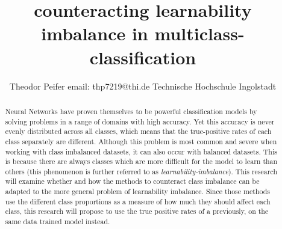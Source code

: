 \documentclass[journal]{IEEEtran}
\begin{document}
 
\title{\textbf{counteracting learnability imbalance in multiclass-classification}}

\author{Theodor Peifer
        \linebreak
        email: thp7219@thi.de
        \linebreak
        Technische Hochschule Ingolstadt
}

\maketitle

\begin{abstract}
Neural Networks have proven themselves to be powerful classification
models by solving problems in a range of domains with high accuracy.
Yet this accuracy is never evenly distributed across all classes, which means that the true-positive rates of each class separately are different.
Although this problem is most common and severe when working with class imbalanced datasets, it can also occur with balanced datasets.
This is because there are always classes which are more difficult for the model to learn than others (this phenomenon is further referred to as \emph{learnability-imbalance}).
This research will examine whether and how the methods to counteract class imbalance can be adapted to the more general problem of learnability imbalance.
Since those methods use the different class proportions as a measure of how much they should affect each class, this research will propose
to use the true positive rates of a previously, on the same data trained model instead. %

\end{abstract}
\end{document}
